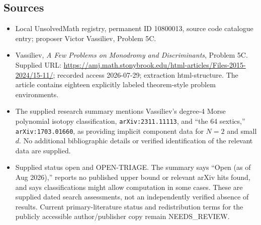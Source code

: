 \documentclass[11pt]{article}
\begin{document}
\subsection{Sources}
\begin{itemize}
\item Local UnsolvedMath registry, permanent ID 10800013, source code catalogue entry; proposer Victor Vassiliev, Problem 5C.
\item Vassiliev, \emph{A Few Problems on Monodromy and Discriminants}, Problem 5C. Supplied URL: \url{https://amj.math.stonybrook.edu/html-articles/Files-2015-2024/15-11/}; recorded access 2026-07-29; extraction html-structure. The article contains eighteen explicitly labeled theorem-style problem environments.
\item The supplied research summary mentions Vassiliev's degree-4 Morse polynomial isotopy classification, \texttt{arXiv:2311.11113}, and ``the 64 sextics,'' \texttt{arXiv:1703.01660}, as providing implicit component data for \(N=2\) and small \(d\). No additional bibliographic details or verified identification of the relevant data are supplied.
\item Supplied status open and OPEN-TRIAGE. The summary says ``Open (as of Aug 2026),'' reports no published upper bound or relevant arXiv hits found, and says classifications might allow computation in some cases. These are supplied dated search assessments, not an independently verified absence of results. Current primary-literature status and redistribution terms for the publicly accessible author/publisher copy remain NEEDS\_REVIEW.
\end{itemize}
\end{document}

